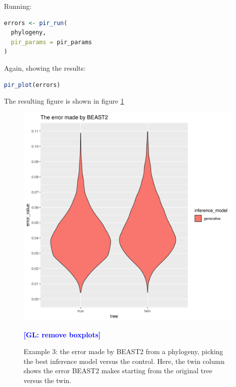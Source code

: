 \documentclass{article}
\newcommand{\giovanni}[1]{\textcolor{blue}{\textbf{[GL: #1]}}}
\begin{document}
Running:

\begin{lstlisting}[language=R, floatplacement=ht, frame=single]
errors <- pir_run(
  phylogeny,
  pir_params = pir_params
)
\end{lstlisting}

Again, showing the results:

\begin{lstlisting}[language=R, floatplacement=ht, frame=single]
pir_plot(errors)
\end{lstlisting}

The resulting figure is shown in figure \ref{fig:example_3}

\begin{figure}[ht]
  \includegraphics[width=\textwidth]{example_3_errors.png}
  \caption{
    Example 3: the error made by BEAST2 from a phylogeny, picking the best inference model versus the control.
    Here, the twin column shows the error BEAST2 makes starting from the original tree versus the twin. 
  }
  \label{fig:example_3}
  \giovanni{remove boxplots}
\end{figure}

\end{document}
